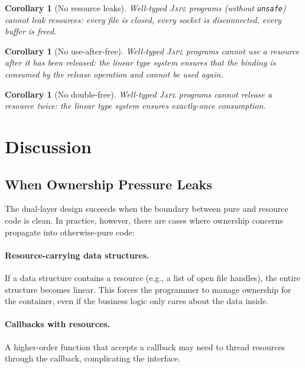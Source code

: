 \documentclass[11pt]{article}
\newtheorem{corollary}[theorem]{Corollary}
\newcommand{\JAPL}{\textsc{Japl}}
\begin{document}
\begin{corollary}[No resource leaks]\label{cor:no-leaks}
Well-typed \JAPL{} programs (without \texttt{unsafe}) cannot leak
resources: every file is closed, every socket is disconnected, every
buffer is freed.
\end{corollary}

\begin{corollary}[No use-after-free]\label{cor:no-uaf}
Well-typed \JAPL{} programs cannot use a resource after it has been
released: the linear type system ensures that the binding is consumed
by the release operation and cannot be used again.
\end{corollary}

\begin{corollary}[No double-free]\label{cor:no-double-free}
Well-typed \JAPL{} programs cannot release a resource twice: the linear
type system ensures exactly-once consumption.
\end{corollary}


\section{Discussion}\label{sec:discussion}

\subsection{When Ownership Pressure Leaks}

The dual-layer design succeeds when the boundary between pure and
resource code is clean.  In practice, however, there are cases where
ownership concerns propagate into otherwise-pure code:

\paragraph{Resource-carrying data structures.}
If a data structure contains a resource (e.g., a list of open file
handles), the entire structure becomes linear.  This forces the
programmer to manage ownership for the container, even if the
business logic only cares about the data inside.

\paragraph{Callbacks with resources.}
A higher-order function that accepts a callback may need to thread
resources through the callback, complicating the interface.
\end{document}
